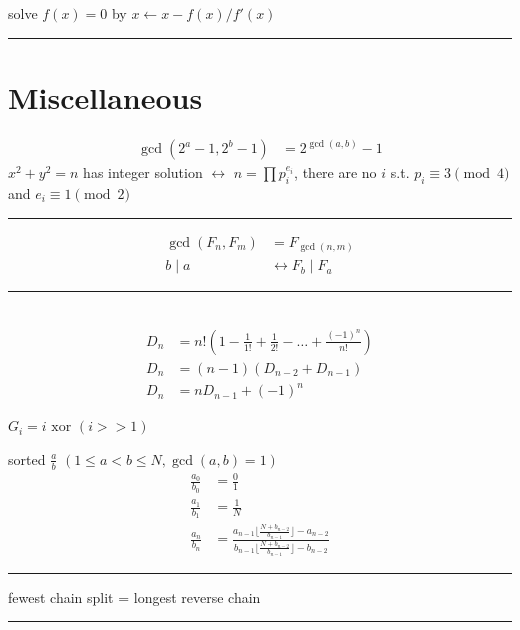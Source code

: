 \documentclass[10pt,landscape]{article}
\begin{document}
 solve $f(x) = 0$ by $x \leftarrow x - f(x) / f'(x)$

\noindent\rule{\linewidth}{1pt}

\section{Miscellaneous}

\begin{align*}
	\gcd(2^a-1, 2^b-1) &= 2^{\gcd(a,b)}-1
\end{align*}
$x^2 + y^2 = n$ has integer solution $\leftrightarrow$ $n = \prod{p_i^{e_i}}$, there are no $i$ s.t. $p_i \equiv 3 \pmod{4}$ and $e_i \equiv 1 \pmod{2}$

\noindent\rule{\linewidth}{1pt}

\begin{align*}
	\gcd(F_n, F_m) &= F_{\gcd(n, m)} \\
	b \mid a &\leftrightarrow F_b \mid F_a
\end{align*}

\noindent\rule{\linewidth}{1pt}

 \\
\begin{align*}
	D_n &= n! (1 - \frac{1}{1!} + \frac{1}{2!} - \hdots + \frac{(-1)^n}{n!}) \\
	D_n &= (n-1)(D_{n-2} + D_{n-1}) \\
	D_n &= n D_{n-1} + (-1)^n
\end{align*}

 $G_i = i \text{ xor } (i >> 1)$

 sorted $\frac{a}{b}$ $(1 \le a < b \le N, \gcd(a,b) = 1)$
\begin{align*}
	\frac{a_0}{b_0} &= \frac{0}{1} \\
	\frac{a_1}{b_1} &= \frac{1}{N} \\
	\frac{a_n}{b_n} &= \frac{a_{n-1} \lfloor \frac{N+b_{n-2}}{b_{n-1}} \rfloor - a_{n-2}}{b_{n-1} \lfloor \frac{N+b_{n-2}}{b_{n-1}} \rfloor - b_{n-2}}
\end{align*}

\noindent\rule{\linewidth}{1pt}

 fewest chain split = longest reverse chain

\noindent\rule{\linewidth}{1pt}
\end{document}
